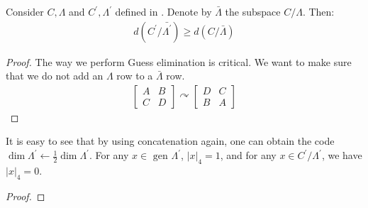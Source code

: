 \documentclass[manuscript,screen,review]{acmart}
\begin{document}
\begin{claim}
  Consider $C,\Lambda$ and $C^{\prime},\Lambda^{\prime}$ defined in . Denote by $\bar{\Lambda}$ the subspace $C/\Lambda$. Then:
  \begin{equation*}
    \begin{split}
  d(C^{\prime}/\bar{\Lambda^{\prime}}) \ge d( C/\bar{\Lambda })
    \end{split}
  \end{equation*} 
\end{claim}

\begin{proof} 
  The way we perform Guess elimination is critical. We want to make sure that we do not add an $\Lambda$ row to a $\bar{\Lambda}$ row. 
  \begin{equation*}
    \begin{split}
      \begin{bmatrix}
        A & B \\ 
        C & D
      \end{bmatrix}	\curvearrowright \begin{bmatrix}
        D & C \\ 
        B & A
      \end{bmatrix}
    \end{split}
  \end{equation*}
\end{proof}


\begin{claim}
  It is easy to see that by using concatenation again, one can obtain the code $\dim \Lambda^{\prime} \leftarrow \frac{1}{2}\dim \Lambda^{\prime}$. For any $x \in \text{ gen } \Lambda^{\prime}$, $|x|_{4} = 1$, and for any $x \in C^{\prime} / \Lambda^{\prime}$, we have $|x|_{4} = 0$.
  \end{claim}

  \begin{proof}
  \end{proof}
\end{document}
